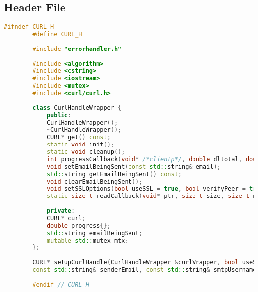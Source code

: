 \documentclass{article}
\begin{document}
	\subsection*{Header File}
	\begin{lstlisting}[language=C++]
		#ifndef CURL_H
		#define CURL_H
		
		#include "errorhandler.h"
		
		#include <algorithm>
		#include <cstring>
		#include <iostream>
		#include <mutex>
		#include <curl/curl.h>
		
		class CurlHandleWrapper {
			public:
			CurlHandleWrapper();
			~CurlHandleWrapper();
			CURL* get() const;
			static void init();
			static void cleanup();
			int progressCallback(void* /*clientp*/, double dltotal, double dlnow, double /*ultotal*/, double /*ulnow*/);
			void setEmailBeingSent(const std::string& email);
			std::string getEmailBeingSent() const;
			void clearEmailBeingSent();
			void setSSLOptions(bool useSSL = true, bool verifyPeer = true, bool verifyHost = true);
			static size_t readCallback(void* ptr, size_t size, size_t nmemb, void* userp);
			
			private:
			CURL* curl;
			double progress{};
			std::string emailBeingSent;
			mutable std::mutex mtx;
		};
		
		CURL* setupCurlHandle(CurlHandleWrapper &curlWrapper, bool useSSL, bool verifyPeer, bool verifyHost, bool verbose,
		const std::string& senderEmail, const std::string& smtpUsername, std::string& mailPassDecrypted, int smtpPort, const std::string& smtpServer);
		
		#endif // CURL_H
	\end{lstlisting}
	
\end{document}
